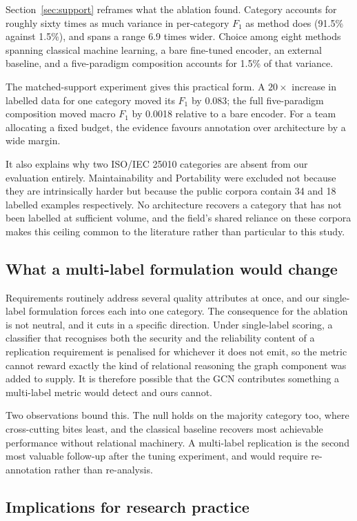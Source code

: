 \documentclass[11pt,a4paper]{article}
\begin{document}
Section~\ref{sec:support} reframes what the ablation found. Category accounts for roughly
sixty times as much variance in per-category $F_1$ as method does (91.5\% against 1.5\%),
and spans a range 6.9 times wider. Choice among eight methods spanning classical machine
learning, a bare fine-tuned encoder, an external baseline, and a five-paradigm composition
accounts for 1.5\% of that variance.

The matched-support experiment gives this practical form. A $20\times$ increase in labelled
data for one category moved its $F_1$ by 0.083; the full five-paradigm composition moved
macro $F_1$ by 0.0018 relative to a bare encoder. For a team allocating a fixed budget, the
evidence favours annotation over architecture by a wide margin.

It also explains why two ISO/IEC 25010 categories are absent from our evaluation entirely.
Maintainability and Portability were excluded not because they are intrinsically harder but
because the public corpora contain 34 and 18 labelled examples respectively. No
architecture recovers a category that has not been labelled at sufficient volume, and the
field's shared reliance on these corpora makes this ceiling common to the literature rather
than particular to this study.

\subsection{What a multi-label formulation would change}
Requirements routinely address several quality attributes at once, and our single-label
formulation forces each into one category. The consequence for the ablation is not neutral,
and it cuts in a specific direction. Under single-label scoring, a classifier that
recognises both the security and the reliability content of a replication requirement is
penalised for whichever it does not emit, so the metric cannot reward exactly the kind of
relational reasoning the graph component was added to supply. It is therefore possible that
the GCN contributes something a multi-label metric would detect and ours cannot.

Two observations bound this. The null holds on the majority category too, where cross-cutting
bites least, and the classical baseline recovers most achievable performance without relational
machinery. A multi-label replication is the second most valuable follow-up after the tuning
experiment, and would require re-annotation rather than re-analysis.

\subsection{Implications for research practice}
\end{document}
